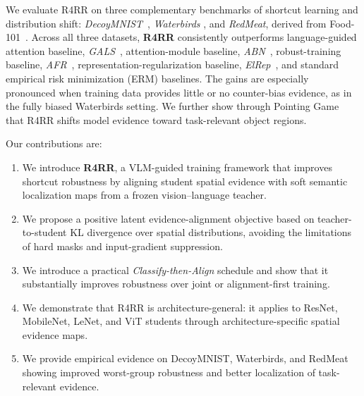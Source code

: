 


We evaluate R4RR on three complementary benchmarks of shortcut learning and distribution shift: \emph{DecoyMNIST}~\cite{erion2021improving}, \emph{Waterbirds} \cite{sagawa2019distributionally}, and \emph{RedMeat}, derived from Food-101~\cite{bossard2014food}. Across all three datasets, \textbf{R4RR} consistently outperforms language-guided attention baseline, \emph{GALS}~\cite{petryk2022guiding}, attention-module baseline, \emph{ABN}~\cite{fukui2019attention}, robust-training baseline, \emph{AFR}~\cite{qiu2023simple}, representation-regularization baseline, \emph{ElRep}~\cite{wen2025elastic}, and standard empirical risk minimization (ERM) baselines. The gains are especially pronounced when training data provides little or no counter-bias evidence, as in the fully biased Waterbirds setting. We further show through Pointing Game~\cite{zhang2018top} that R4RR shifts model evidence toward task-relevant object regions.

Our contributions are:
\begin{enumerate}
\item We introduce \textbf{R4RR}, a VLM-guided training framework that improves shortcut robustness by aligning student spatial evidence with soft semantic localization maps from a frozen vision--language teacher.
\item We propose a positive latent evidence-alignment objective based on teacher-to-student KL divergence over spatial distributions, avoiding the limitations of hard masks and input-gradient suppression.
\item We introduce a practical \emph{Classify-then-Align} schedule and show that it substantially improves robustness over joint or alignment-first training.
\item We demonstrate that R4RR is architecture-general: it applies to ResNet, MobileNet, LeNet, and ViT students through architecture-specific spatial evidence maps.
\item We provide empirical evidence on DecoyMNIST, Waterbirds, and RedMeat showing improved worst-group robustness and better localization of task-relevant evidence.
\end{enumerate}

